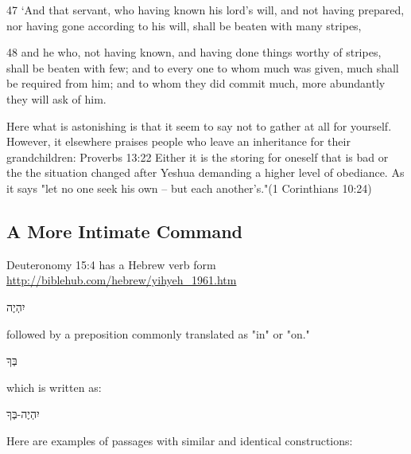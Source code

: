 \documentclass[11pt]{article}
\begin{document}
47 `And that servant, who having known his lord's will, and not having prepared, nor having gone according to his will, shall be beaten with many stripes,

48 and he who, not having known, and having done things worthy of stripes, shall be beaten with few; and to every one to whom much was given, much shall be required from him; and to whom they did commit much, more abundantly they will ask of him.



Here what is astonishing is that it seem to say not to gather at all for yourself. However, it elsewhere praises people who leave an inheritance for their grandchildren: Proverbs 13:22 
Either it is the storing for oneself that is bad or the the situation changed after Yeshua demanding a higher level of obediance. 
As it says "let no one seek his own -- but each another's."(1 Corinthians 10:24)

\subsection{A More Intimate Command} \label{a more intimate command}


Deuteronomy 15:4 has a Hebrew verb form \url{http://biblehub.com/hebrew/yihyeh_1961.htm} \begin{hebrew}
יִהְיֶה
\end{hebrew} followed by a preposition commonly translated as "in" or "on."\begin{hebrew}
בְּךָ
\end{hebrew} which is written as: \begin{hebrew}
יִהְיֶה-בְּךָ
\end{hebrew}

Here are examples of passages with similar and identical constructions:
\end{document}

